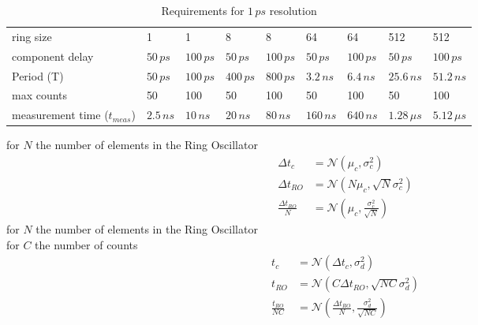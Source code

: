 \begin{table}[H]
\centering
\caption{Requirements for $1\,ps$ resolution}
\label{my-label}
\begin{tabular}{|l|ll|ll|ll|ll|} \hline
ring size                     & 1         & 1         & 8         & 8         & 64          & 64          & 512           & 512        \\
component delay               & $50\,ps$  & $100\,ps$ & $50\,ps$  & $100\,ps$ & $50\,ps$    & $100\,ps$   & $50\,ps$      & $100\,ps$  \\ \hline
Period (T)                    & $50\,ps$  & $100\,ps$ & $400\,ps$ & $800\,ps$ & $3.2\,ns$   & $6.4\,ns$   & $25.6\,ns$    & $51.2\,ns$ \\
max counts                    & 50        & 100       & 50        & 100       & 50          & 100         & 50            & 100      \\
measurement time ($t_{meas}$) & $2.5\,ns$ & $10\,ns$  & $20\,ns$  & $80\,ns$  & $160\,ns$   & $640\,ns$   & $1.28\,\mu s$ & $5.12\,\mu s$  \\ \hline
\end{tabular}
\end{table}

for $N$ the number of elements in the Ring Oscillator
\begin{align*}
\Delta t_c &= \mathcal{N}(\mu_c,\sigma_c^2)\\
\Delta t_{RO}&= \mathcal{N}(N\mu_c,\sqrt{N}\sigma_{c}^2)\\
\frac{\Delta t_{RO}}{N}&= \mathcal{N}(\mu_c,\frac{\sigma_{c}^2}{\sqrt{N}}) 
\end{align*}
for $N$ the number of elements in the Ring Oscillator\\
for $C$ the number of counts
\begin{align*}
t_c &= \mathcal{N}(\Delta t_c,\sigma_d^2)\\
t_{RO}&= \mathcal{N}(C\Delta t_{RO},\sqrt{NC}\sigma_{d}^2) \\
\frac{t_{RO}}{NC}&= \mathcal{N}(\frac{\Delta t_{RO}}{N},\frac{\sigma_{d}^2}{\sqrt{NC}}) 
\end{align*}